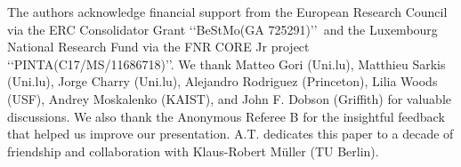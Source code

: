 \documentclass[aps,prl,twocolumn,showpacs,groupaddress]{revtex4-1}
\begin{document}
The authors acknowledge financial support from the European Research Council
via the ERC Consolidator Grant \lq\lq BeStMo(GA 725291)\rq\rq\ and the Luxembourg National Research Fund via the FNR CORE Jr project \lq\lq PINTA(C17/MS/11686718)\rq\rq. We thank Matteo Gori (Uni.lu), Matthieu Sarkis (Uni.lu), Jorge Charry (Uni.lu), Alejandro Rodriguez (Princeton), Lilia Woods (USF), Andrey Moskalenko (KAIST), and John F. Dobson (Griffith) for valuable discussions. We also thank the Anonymous Referee B for the insightful feedback that helped us improve our presentation. A.T. dedicates this paper to a decade of friendship and collaboration with Klaus-Robert M\"uller (TU Berlin).



\end{document}
